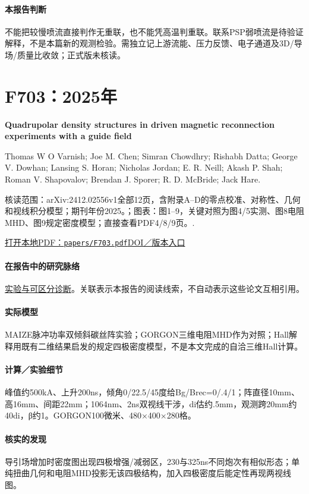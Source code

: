 \paragraph{本报告判断}不能把较慢喷流直接判作无重联，也不能凭高温判重联。联系PSP弱喷流是待验证解释，不是本篇新的观测检验。需独立记上游流能、压力反馈、电子通道及3D/导场/质量比收敛；正式版未核读。

\section{F703：2025年}\label{paper:F703}

\textbf{Quadrupolar density structures in driven magnetic reconnection experiments with a guide field}\citep{F703}\

Thomas W O Varnish;  Joe M. Chen;  Simran Chowdhry;  Rishabh Datta;  George V. Dowhan;  Lansing S. Horan;  Nicholas Jordan;  E. R. Neill;  Akash P. Shah;  Roman V. Shapovalov;  Brendan J. Sporer;  R. D. McBride;  Jack Hare.

\textsf{核读范围：}arXiv:2412.02556v1全部12页，含附录A–D的零点校准、对称性、几何和视线积分模型；期刊年份2025。；\textsf{图表：}图1–9，关键对照为图4/5实测、图8电阻MHD、图9规定密度模型；直接查看PDF4/8/9页。.

\href{run:papers/F703.pdf}{打开本地PDF：\texttt{papers/F703.pdf}}\quad\href{https://doi.org/10.1063/5.0251581}{DOI／版本入口}

\paragraph{在报告中的研究脉络}\hyperref[story:diagnostic]{实验与可区分诊断}。关联表示本报告的阅读线索，不自动表示这些论文互相引用。

\paragraph{实际模型}MAIZE脉冲功率双倾斜碳丝阵实验；GORGON三维电阻MHD作为对照；Hall解释用既有二维结果启发的规定四极密度模型，不是本文完成的自洽三维Hall计算。

\paragraph{计算／实验细节}峰值约500kA、上升200ns，倾角0/22.5/45度给Bg/Brec=0/.4/1；阵直径10mm、高16mm、间距22mm；1064nm、2ns双视线干涉，di估约.5mm，观测跨20mm约40di，β约1。GORGON100微米、480×400×280格。

\paragraph{核实的发现}导引场增加时密度图出现四极增强/减弱区，230与325ns不同炮次有相似形态；单纯扭曲几何和电阻MHD投影无该四极结构，加入四极密度后能定性再现两视线图。

